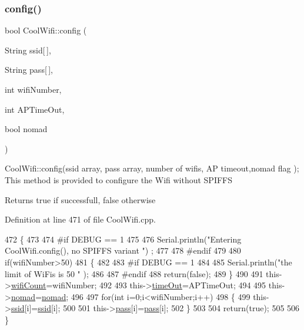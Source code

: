 \subsubsection{\texorpdfstring{config()}{config()}\hspace{0.1cm}{\footnotesize\ttfamily [2/2]}}
{\footnotesize\ttfamily bool Cool\+Wifi\+::config (\begin{DoxyParamCaption}\item[{String}]{ssid\mbox{[}$\,$\mbox{]},  }\item[{String}]{pass\mbox{[}$\,$\mbox{]},  }\item[{int}]{wifi\+Number,  }\item[{int}]{A\+P\+Time\+Out,  }\item[{bool}]{nomad }\end{DoxyParamCaption})}

Cool\+Wifi\+::config(ssid array, pass array, number of wifis, A\+P timeout,nomad flag ); This method is provided to configure the Wifi without S\+P\+I\+F\+FS

\begin{DoxyReturn}{Returns}
true if successfull, false otherwise 
\end{DoxyReturn}


Definition at line 471 of file Cool\+Wifi.\+cpp.


\begin{DoxyCode}
472 \{
473 
474 \textcolor{preprocessor}{#if DEBUG == 1 }
475     
476     Serial.println(\textcolor{stringliteral}{"Entering CoolWifi.config(), no SPIFFS variant "}) ;
477     
478 \textcolor{preprocessor}{#endif}
479     
480     \textcolor{keywordflow}{if}(wifiNumber>50)
481     \{
482     
483 \textcolor{preprocessor}{    #if DEBUG == 1 }
484         
485         Serial.println(\textcolor{stringliteral}{"the limit of WiFis is 50 "} );
486         
487 \textcolor{preprocessor}{    #endif}
488         \textcolor{keywordflow}{return}(\textcolor{keyword}{false});  
489     \}
490 
491     this->\hyperlink{class_cool_wifi_ab133bd92fcb895b884deecd6678592e4}{wifiCount}=wifiNumber;
492 
493     this->\hyperlink{class_cool_wifi_a952111605f25156588b5632caaba1c6f}{timeOut}=APTimeOut;
494 
495     this->\hyperlink{class_cool_wifi_ab7d9643c4af7bac3be331ef008b2ea27}{nomad}=\hyperlink{class_cool_wifi_ab7d9643c4af7bac3be331ef008b2ea27}{nomad};
496     
497     \textcolor{keywordflow}{for}(\textcolor{keywordtype}{int} i=0;i<wifiNumber;i++)
498     \{
499         this->\hyperlink{class_cool_wifi_a893b21d0fed821438733bba2e73fb4c2}{ssid}[i]=\hyperlink{class_cool_wifi_a893b21d0fed821438733bba2e73fb4c2}{ssid}[i];
500         
501         this->\hyperlink{class_cool_wifi_a0c3332a149245aaad060b32593a54c9b}{pass}[i]=\hyperlink{class_cool_wifi_a0c3332a149245aaad060b32593a54c9b}{pass}[i];
502     \}
503         
504     \textcolor{keywordflow}{return}(\textcolor{keyword}{true});
505 
506 \}
\end{DoxyCode}
\mbox{\label{class_cool_wifi_ad060353050f40d032a2dbf9e54a768bf}} 
